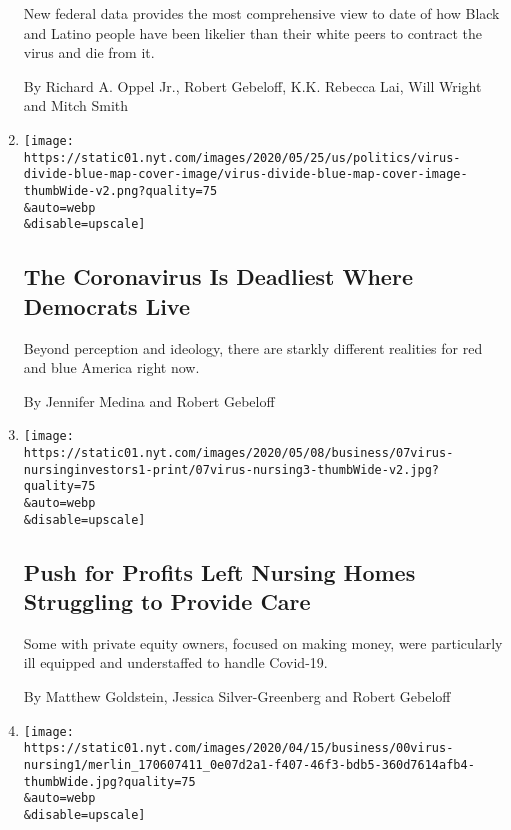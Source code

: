 \begin{enumerate}
  New federal data provides the most comprehensive view to date of how
  Black and Latino people have been likelier than their white peers to
  contract the virus and die from it.

  By Richard A. Oppel Jr., Robert Gebeloff, K.K. Rebecca Lai, Will
  Wright and Mitch Smith
\item
  \href{/2020/05/25/us/politics/coronavirus-red-blue-states.html}{}

  \texttt{[image: https://static01.nyt.com/images/2020/05/25/us/politics/virus-divide-blue-map-cover-image/virus-divide-blue-map-cover-image-thumbWide-v2.png?quality=75\\\&auto=webp\\\&disable=upscale]}

  \hypertarget{the-coronavirus-is-deadliest-where-democrats-live}{%
  \subsection{The Coronavirus Is Deadliest Where Democrats
  Live}\label{the-coronavirus-is-deadliest-where-democrats-live}}

  Beyond perception and ideology, there are starkly different realities
  for red and blue America right now.

  By Jennifer Medina and Robert Gebeloff
\item
  \href{/2020/05/07/business/coronavirus-nursing-homes.html}{}

  \texttt{[image: https://static01.nyt.com/images/2020/05/08/business/07virus-nursinginvestors1-print/07virus-nursing3-thumbWide-v2.jpg?quality=75\\\&auto=webp\\\&disable=upscale]}

  \hypertarget{push-for-profits-left-nursing-homes-struggling-to-provide-care}{%
  \subsection{Push for Profits Left Nursing Homes Struggling to Provide
  Care}\label{push-for-profits-left-nursing-homes-struggling-to-provide-care}}

  Some with private equity owners, focused on making money, were
  particularly ill equipped and understaffed to handle Covid-19.

  By Matthew Goldstein, Jessica Silver-Greenberg and Robert Gebeloff
\item
  \href{/2020/04/21/business/coronavirus-nursing-home-finances.html}{}

  \texttt{[image: https://static01.nyt.com/images/2020/04/15/business/00virus-nursing1/merlin\_170607411\_0e07d2a1-f407-46f3-bdb5-360d7614afb4-thumbWide.jpg?quality=75\\\&auto=webp\\\&disable=upscale]}


\end{enumerate}
